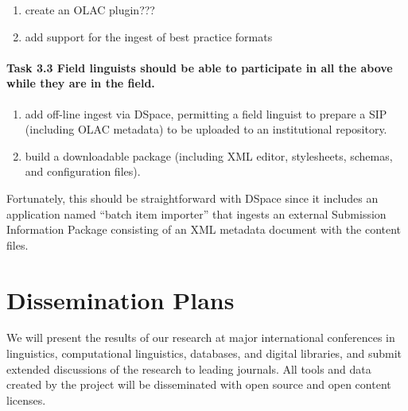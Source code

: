 \begin{enumerate}[label=\textit{\task\alph*}]
\item create an OLAC plugin???
\item add support for the ingest of best practice formats
\end{enumerate}

\def\task{3.3}
\paragraph{Task {\task} Field linguists should be able to participate in all the
    above while they are in the field.}

\begin{enumerate}[label=\textit{\task\alph*}]
\item add off-line ingest via DSpace, permitting a field linguist to
    prepare a SIP (including OLAC metadata) to be uploaded to an
    institutional repository.
\item build a downloadable package (including XML editor,
    stylesheets, schemas, and configuration files).
\end{enumerate}

Fortunately, this should be straightforward with DSpace since it
includes an application named ``batch item importer'' that ingests an
external Submission Information Package consisting of an XML metadata
document with the content files.

\section{Dissemination Plans}
\label{sec:dissemination}

We will present the results of our research at major international
conferences in linguistics, computational linguistics, databases, and
digital libraries, and submit extended discussions of the research to
leading journals.  All tools and data created by the project will be
disseminated with open source and open content licenses.

